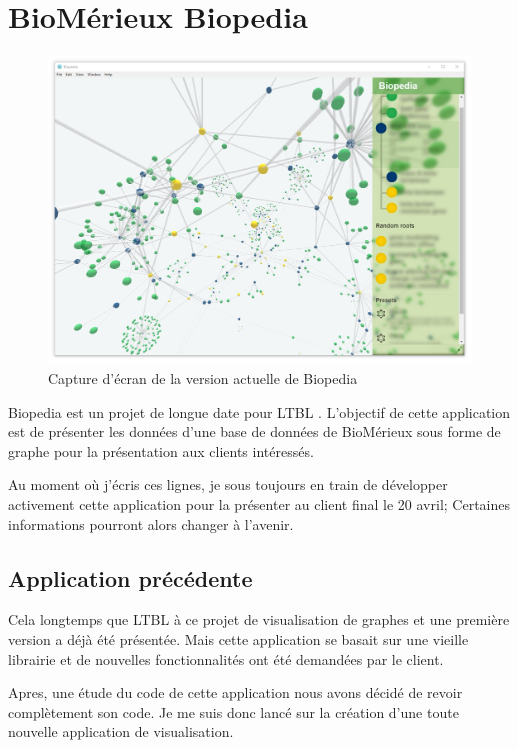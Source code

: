 \section{BioMérieux Biopedia}
\label{biomerieuxBiopedia}

\begin{figure}[h]
    \centering
    \includegraphics[scale=0.35]{img/Biopedia.jpg}
    \caption{Capture d'écran de la version actuelle de Biopedia}
\end{figure}

Biopedia est un projet de longue date pour LTBL .
L'objectif de cette application est de présenter les données d'une base de données de BioMérieux sous forme de graphe pour la présentation aux clients intéressés.

Au moment où j'écris ces lignes, je sous toujours en train de développer activement cette application pour la présenter au client final le 20 avril;
Certaines informations pourront alors changer à l'avenir.

\subsection{Application précédente}
\label{biomerieuxBiopediaApplicationPrécédente}

Cela longtemps que LTBL à ce projet de visualisation de graphes et une première version a déjà été présentée.
Mais cette application se basait sur une vieille librairie et de nouvelles fonctionnalités ont été demandées par le client.

Apres, une étude du code de cette application nous avons décidé de revoir complètement son code.
Je me suis donc lancé sur la création d'une toute nouvelle application de visualisation.

